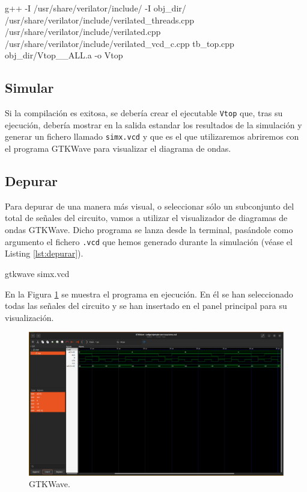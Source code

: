 \begin{mycode}[style=bashstyle, label=lst:compilar-tb-traza, caption={Compilación del banco de pruebas incluyendo el fichero necesario para crear trazas.}]
g++ -I /usr/share/verilator/include/ -I obj_dir/ /usr/share/verilator/include/verilated_threads.cpp /usr/share/verilator/include/verilated.cpp /usr/share/verilator/include/verilated_vcd_c.cpp tb_top.cpp obj_dir/Vtop__ALL.a -o Vtop
\end{mycode}

\subsection{Simular}
Si la compilación es exitosa, se debería crear el ejecutable \verb|Vtop| que, tras su ejecución, debería mostrar en la salida estandar los resultados de la simulación y generar un fichero llamado \verb|simx.vcd| y que es el que utilizaremos abriremos con el programa GTKWave para visualizar el diagrama de ondas.

\subsection{Depurar}
Para depurar de una manera más visual, o seleccionar sólo un subconjunto del total de señales del circuito, vamos a utilizar el visualizador de diagramas de ondas GTKWave. Dicho programa se lanza desde la terminal, pasándole como argumento el fichero \verb|.vcd| que hemos generado durante la simulación (véase el Listing \ref{lst:depurar}).

\begin{mycode}[style=bashstyle, label=lst:depurar, caption={Instrucción para lanzar el programa de visualización de diagramas de ondas.}]
gtkwave simx.vcd
\end{mycode}

En la Figura \ref{fig:gtkwave-ejemplo-con-traza} se muestra el programa en ejecución. En él se han seleccionado todas las señales del circuito y se han insertado en el panel principal para su visualización.

\begin{figure}[htb]
	\centering
	\includegraphics[width=\textwidth]{figs/gtkwave-ejemplo-con-traza.png}
	\caption{GTKWave.}
	\label{fig:gtkwave-ejemplo-con-traza}
\end{figure}
